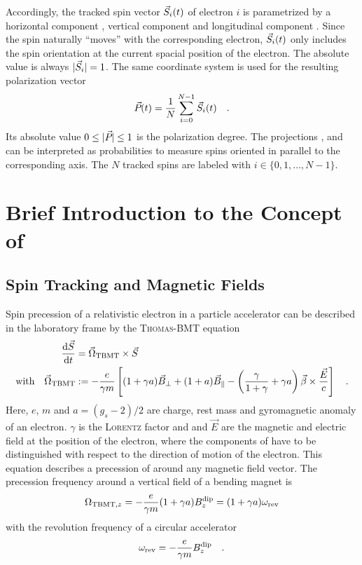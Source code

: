 \documentclass[a4paper]{scrartcl}
\begin{document}
Accordingly, the tracked spin vector $\svec[i](t)$ of electron $i$ is parametrized by a horizontal
component \sx, vertical component \sz and longitudinal component \slong. Since the spin
naturally \enquote{moves} with the corresponding electron, $\svec[i](t)$ only
includes the spin orientation at the current spacial position of the electron. The
absolute value is always $|\svec[i]| = 1$.
%
The same coordinate system is used for the resulting polarization vector
\begin{equation*}
\pvec(t) = \frac{1}{N} \sum_{i=0}^{N-1} \svec[i](t) \quad.
\end{equation*}
Its absolute value $0\leq\pabs\leq 1$ is the polarization degree. The projections \px, \pz
and \plong can be interpreted as probabilities to measure spins oriented in parallel to
the corresponding axis.
%
The $N$ tracked spins are labeled with $i\in \{0,1,\dots,N-1\}$.




\section{Brief Introduction to the Concept of \polem}
\label{sec:brief-intr}

\subsection{Spin Tracking and Magnetic Fields}
\label{sec:concept-spin-tracking}
Spin precession of a relativistic electron in a particle accelerator can be described in
the laboratory frame by the
\textsc{Thomas-BMT} equation \cite{thomas,bmt}
\begin{align}
  \nonumber
  \frac{\dif \svec}{\dif t} &= \wtbmtvec\times\svec\\
  \label{eq:tbmt}
  \text{with}\quad
  \wtbmtvec &:= - \frac{e}{\gamma m} \left[ (1+\ga)\btrans + (1+a)\bpara
    - \left(\frac{\gamma}{1+\gamma} +\ga\right)\vec\beta\times\frac{\vec E}{c} \right] \quad.
\end{align}
Here, $e$, $m$ and $a=(g_s-2)/2$ are charge, rest mass and gyromagnetic anomaly of an
electron. 
$\gamma$ is the \textsc{Lorentz} factor and \bvec and $\vec E$ are the magnetic and
electric  field at the position of the electron, where the components of \bvec have to be
distinguished with respect to the direction of motion of the electron.
%
This equation describes a precession of \svec around any magnetic field vector. The precession
frequency around a vertical field \bdip of a bending magnet is
\begin{equation}
  \label{eq:omegaDip}
  \Omega_{\text{TBMT}, z} = - \frac{e}{\gamma m} (1+\ga) \bdip = (1+\ga) \wrev
\end{equation}
with the revolution frequency of a circular accelerator
\begin{equation*}
  \wrev = - \frac{e}{\gamma m} \bdip \quad.
\end{equation*}
\end{document}
